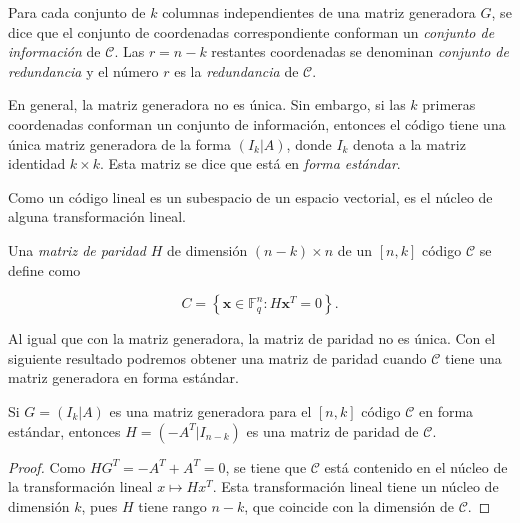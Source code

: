 \begin{definition}
    Para cada conjunto de $k$ columnas independientes de una matriz generadora $G$, se dice que el conjunto de coordenadas correspondiente conforman un \emph{conjunto de información} de $\mathcal{C}$. Las $r = n-k$ restantes coordenadas se denominan \emph{conjunto de redundancia} y el número $r$ es la \emph{redundancia} de $\mathcal{C}$.
\end{definition}

En general, la matriz generadora no es única. Sin embargo, si las $k$ primeras coordenadas conforman un conjunto de información, entonces el código tiene una única matriz generadora de la forma $( I_k | A)$, donde $I_k$ denota a la matriz identidad $k \times k$. Esta matriz se dice que está en \emph{forma estándar}.

Como un código lineal es un subespacio de un espacio vectorial, es el núcleo de alguna transformación lineal.

\begin{definition}
    Una \emph{matriz de paridad} $H$ de dimensión $(n-k) \times n$ de un $\left[ n,k \right]$ código $\mathcal{C}$ se define como

    $$C = \left\lbrace \mathbf{x} \in \mathbb{F} _q^n : H\mathbf{x}^T = 0 \right\rbrace .$$
\end{definition}

Al igual que con la matriz generadora, la matriz de paridad no es única. Con el siguiente resultado podremos obtener una matriz de paridad cuando $\mathcal{C}$ tiene una matriz generadora en forma estándar.

\begin{theorem}
    \label{th:generadora-paridad}
    Si $G = \left( I_k | A \right)$ es una matriz generadora para el $\left[ n,k \right]$ código $\mathcal{C}$ en forma estándar, entonces $H = \left( -A^T | I_{n-k} \right)$ es una matriz de paridad de $\mathcal{C}$.
\end{theorem}

\begin{proof}
    Como $HG^T = -A^T + A^T = 0$, se tiene que $\mathcal{C}$ está contenido en el núcleo de la transformación lineal $x \mapsto Hx^T$. Esta transformación lineal tiene un núcleo de dimensión $k$, pues $H$ tiene rango $n-k$, que coincide con la dimensión de $\mathcal{C}$.
\end{proof}

